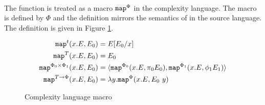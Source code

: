\paragraph{}
The  function is treated as a macro $\texttt{map}^\Phi$ in the complexity
language. The macro is defined by $\Phi$ and the definition mirrors the
semantics of  in the source language. The definition is given in Figure
\ref{fig:complexity_language_map}.
%
\begin{figure}
\caption{Complexity language  macro}
\label{fig:complexity_language_map}
\begin{align*}
  \T{map}^t(x.E,E_0) &= E[E_0/x] \\
  \T{map}^T(x.E,E_0) &= E_0 \\
  \T{map}^{\Phi_0\times\Phi_1}(x.E,E_0) &= \LP\T{map}^{\Phi_0}(x.E,\pi_0 E_0), \T{map}^{\Phi_1}(x.E,\phi_1 E_1)\RP \\
  \T{map}^{T \to \Phi}(x.E,E_0) &= \lambda y.\T{map}^\Phi(x.E,E_0\ y)
\end{align*}
\end{figure}
%


